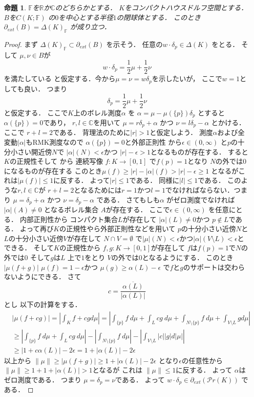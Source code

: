 \documentclass[leqno, a4paper, 12pt]{jsarticle}
\newtheorem{prop}[thm]{命題}
\newcommand{\rr}{\mathbb{R}}
\newcommand{\cc}{\mathbb{C}}
\newcommand{\myextreme}[1]{\partial_{ext}(#1)}
\newcommand{\myprob}[1]{\mathcal{P}r(#1)}
\newcommand{\mydiracset}[1]{\Delta(#1)}
\newcommand{\mydiracsetq}[2]{\Delta(#1)_{#2}}
\newcommand{\mygenf}{\mathbb{F}}
\newcommand{\mydirac}[1]{\delta_{#1}}
\begin{document}
\begin{prop}
$\mygenf$を$\rr$か$\cc$のどちらかとする．
$K$をコンパクトハウスドルフ空間とする．
$B$を$C(K; \mygenf)$
の$0$を中心とする半径$1$の閉球体とする．
このとき
$\myextreme{B}=\mydiracsetq{K}{\mygenf}$
が成り立つ．
\end{prop}
\begin{proof}
まず
$\mydiracsetq{K}{\mygenf}\subset \myextreme{B}$
を示そう．
任意の$w\cdot \mydirac{p}\in \mydiracset{K}$
をとる．
そして
$\mu, \nu\in B$が
\[
w\cdot \delta_{p}=\frac{1}{2}\mu+\frac{1}{2}\nu
\]
を満たしている
と仮定する．今から$\mu=\nu=w\mydirac{p}$を示したいが，
ここで$w=1$としても良い．
つまり
\[
\mydirac{p}=\frac{1}{2}\mu+\frac{1}{2}\nu
\]
と仮定する．
ここで$K$上のボレル測度$\alpha$
を
$\alpha=\mu-\mu(\{p\})\mydirac{p}$
とすると
$\alpha(\{p\})=0$であり，
$r, l\in \cc$を用いて
$\mu=r\mydirac{p}+\alpha$
かつ
$\nu=l\mydirac{p}-\alpha$
とかける．ここで
$r+l=2$である．
背理法のために$|r|>1$と仮定しよう．
測度$\alpha$および全変動$|\alpha|$もRMK測度なので
$\alpha(\{p\})=0$と外部正則性
から$\epsilon \in (0, \infty)$
と$p$の十分小さい開近傍$N$で
$|\alpha|(N)<\epsilon$かつ
$|r|-\epsilon>1$となるものが存在する．
すると$K$の正規性そして
から
連続写像
$f\colon K\to [0, 1]$
で$f(p)=1$となり
$N$の外では$0$になるものが存在する
このとき$\mu(f)\ge |r|-|\alpha|(f)>|r|-\epsilon \ge 1$
となるがこれは$|\mu(f)|\le 1$に反する．
よって$|r|\le 1$である．
同様に$|l|\le 1$である．
このような$r, l\in \cc$が
$r+l=2$となるためには$r=1$かつ$l=1$でなければならない．つまり
$\mu=\mydirac{p}+\alpha$
かつ
$\nu=\mydirac{p}-\alpha$
である．
さてもしも$\alpha$
がゼロ測度でなければ
$|\alpha|(A)\neq 0$
となるボレル集合
$A$が存在する．
ここで$\epsilon\in (0, \infty)$
を任意にとる．
内部正則性から
コンパクト集合$L$が存在して
$|\alpha|(L)\neq 0$かつ
$p\not \in L$である．
よって再び$K$の正規性やら外部正則性などを用いて
$p$の十分小さい近傍$N$と
$L$の十分小さい近傍$V$が存在して
$N\cap V=\emptyset$
で$|\mu|(N)<\epsilon$かつ$|\alpha|(V\setminus L)< \epsilon$とできる．
そして$K$の正規性から
$f, g\colon K\to [0, 1]$が存在して
$f$は$f(p)=1$で$N$の外では$0$
そして$g$は$L$
上で$1$をとり
$V$の外では$0$となるようにする．
このとき
$|\mu(f+g)|$
$\mu(f)=1-\epsilon$かつ
$\mu(g)\ge \alpha(L)-\epsilon$
で$f$と$g$のサポートは交わらないようにできる．
さて
\[
c=\frac{\overline{\alpha(L)}}{|\alpha(L)|}
\]とし
以下の計算をする．
\begin{align*}
&|\mu(f+cg)|=\left|\int_{K}f+cgd\mu\right|
=\left|\int_{\{p\}}f\ d\mu +\int_{L}cg\ d\mu+
\int_{N\setminus \{p\}}f\ d\mu+\int_{V\setminus L}gd\mu\right|
\\
&\ge 
\left|\int_{\{p\}}f\ d\mu +\int_{L}cg\ d\mu\right|
-\left|\int_{N\setminus \{p\}}f\ d\mu\right|
-\left|\int_{V\setminus L}|c||g|d|\mu|\right|
\\
&\ge 
|1+c\alpha(L)|-2\epsilon
=1+|\alpha(L)|-2\epsilon 
\end{align*}
以上から
$\|\mu\|\ge |\mu(f+g)|\ge 1+|\alpha(L)|-2\epsilon$
となり$\epsilon$の任意性から
$\|\mu\|\ge 1+1+|\alpha(L)|>1$となるが
これは
$\|\mu\|\le 1$に反する．
よって
$\alpha$はゼロ測度である．
つまり
$\mu=\mydirac{p}=\nu$である．
よって
$w\cdot \mydirac{p}\in \myextreme{\myprob{K}}$
である．



\end{proof}
\end{document}
